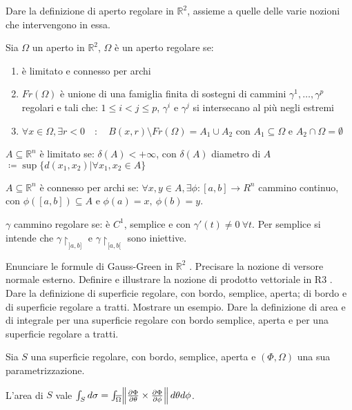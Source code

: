 \documentclass{exam}
\newcommand{\R}[0]{\mathbb{R}}
\begin{document}
\begin{questions}
\question Dare la definizione di aperto regolare in $\R^2$, assieme a quelle delle varie nozioni che intervengono in essa.
\begin{solution}
    Sia $\Omega$ un aperto in $\R^2$, $\Omega$ è un aperto regolare se:
    \begin{enumerate}
        \item è limitato e connesso per archi
        \item $Fr(\Omega)$ è unione di una famiglia finita di sostegni di cammini $\gamma^1 ,\dotsc, \gamma^p$ regolari e tali che:
        $1\leq i < j \leq p$,  $\gamma^i$ e $\gamma^j$ si intersecano al più negli estremi
        \item $\forall x \in \Omega, \exists r<0 \quad : \quad B(x,r) \setminus Fr(\Omega) = A_1 \cup A_2$ con $A_1 \subseteq \Omega$ e $A_2 \cap \Omega = \emptyset$
    \end{enumerate}

    $A\subseteq \R^n$ è limitato se: $\delta(A) < + \infty$, con $\delta(A)$ diametro di $A$ $\coloneqq\sup\{d(x_1,x_2) | \forall x_1, x_2 \in A\}$

    $A\subseteq \R^n$ è connesso per archi se: $\forall x, y \in A, \exists \phi:[a,b] \to R^n$ cammino continuo, con $\phi([a,b])\subseteq A$ e $\phi(a) = x,\  \phi(b) = y$.

    $\gamma$ cammino regolare se: è $C^1$, semplice e con $\gamma'(t) \not= 0 \ \forall t$. Per semplice si intende che $\gamma\restriction_{]a,b]}$ e $\gamma\restriction_{[a,b[}$ sono iniettive.
\end{solution}

\question Enunciare le formule di Gauss-Green in $\R^2$ . Precisare la nozione di versore normale esterno.
\question Definire e illustrare la nozione di prodotto vettoriale in R3 .
\question Dare la definizione di superficie regolare, con bordo, semplice, aperta; di bordo e di superficie regolare a tratti. Mostrare un esempio.
\question Dare la definizione di area e di integrale per una superficie regolare con bordo semplice, aperta e per una superficie regolare a tratti.

\begin{solution}
Sia $S$ una superficie regolare, con bordo, semplice, aperta e $(\Phi, \Omega)$ una sua parametrizzazione.

L'area di $S$ vale $\int_S d\sigma = \int_{\overline{\Omega}} \norm{\pdv{\Phi}{\theta} \times \pdv{\Phi}{\phi}} d\theta d\phi$.


\end{solution}
\end{questions}
\end{document}
